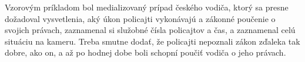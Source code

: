 \documentclass[openany]{book}
\begin{document}
Vzorovým príkladom bol medializovaný prípad českého vodiča, ktorý sa presne dožadoval vysvetlenia, aký úkon policajti vykonávajú a zákonné poučenie o svojich právach, zaznamenal si služobné čísla policajtov a čas, a zaznamenal celú situáciu na kameru. Treba smutne dodať, že policajti nepoznali zákon zďaleka tak dobre, ako on, a až po hodnej dobe boli schopní poučiť vodiča o jeho právach. \cite{idnes} 



\nocite{*}





\end{document}
